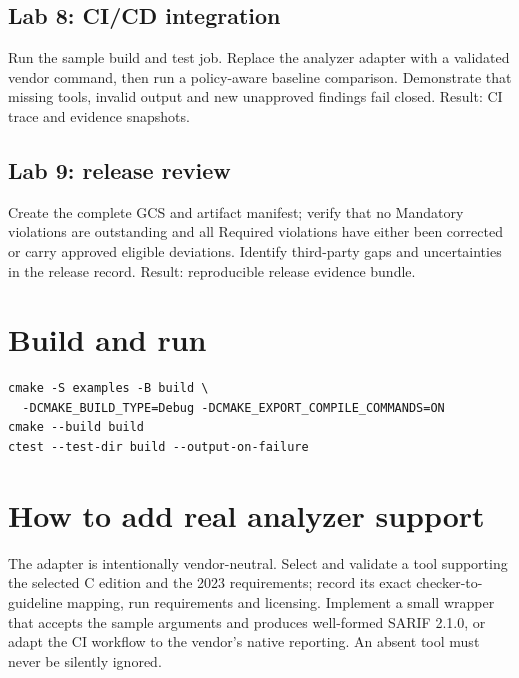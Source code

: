 \documentclass[10pt,letterpaper]{article}
\begin{document}
\subsection{Lab 8: CI/CD integration}
Run the sample build and test job. Replace the analyzer adapter with a validated vendor command, then run a policy-aware baseline comparison. Demonstrate that missing tools, invalid output and new unapproved findings fail closed. Result: CI trace and evidence snapshots.
\subsection{Lab 9: release review}
Create the complete GCS and artifact manifest; verify that no Mandatory violations are outstanding and all Required violations have either been corrected or carry approved eligible deviations. Identify third-party gaps and uncertainties in the release record. Result: reproducible release evidence bundle.
\section{Build and run}
\begin{lstlisting}[style=plaincode]
cmake -S examples -B build \
  -DCMAKE_BUILD_TYPE=Debug -DCMAKE_EXPORT_COMPILE_COMMANDS=ON
cmake --build build
ctest --test-dir build --output-on-failure
\end{lstlisting}
\section{How to add real analyzer support}
The adapter is intentionally vendor-neutral. Select and validate a tool supporting the selected C edition and the 2023 requirements; record its exact checker-to-guideline mapping, run requirements and licensing. Implement a small wrapper that accepts the sample arguments and produces well-formed SARIF 2.1.0, or adapt the CI workflow to the vendor's native reporting. An absent tool must never be silently ignored.
\end{document}
